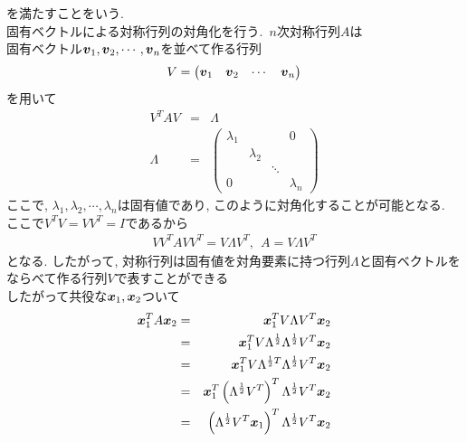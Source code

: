 \documentclass[dvipdfmx,a4j]{jsarticle}
\begin{document}
を満たすことをいう.\\
固有ベクトルによる対称行列の対角化を行う.\ $n$次対称行列$A$は\\
固有ベクトル$\mbox{\boldmath $v$}_{1},\mbox{\boldmath $v$}_{2},\cdots,\mbox{\boldmath $v$}_{n}$を並べて作る行列
\begin{eqnarray*}
    V=\begin{pmatrix}\mbox{\boldmath $v$}_{1}&\mbox{\boldmath $v$}_{2}&\cdots&\mbox{\boldmath $v$}_{n}\end{pmatrix}
\end{eqnarray*}
を用いて
\begin{eqnarray*}
    V^{T}AV &=& \Lambda\\
    \Lambda&=&\begin{pmatrix}\lambda_{1}&&&0\\ & \lambda_{2}&&\\ &&\ddots& \\ 0&&&\lambda_{n}\end{pmatrix}
\end{eqnarray*}
ここで, $\lambda_{1},\lambda_{2},\cdots,\lambda_{n}$は固有値であり, このように対角化することが可能となる.\\
ここで$V^{T}V=VV^{T}=I$であるから
\begin{eqnarray*}
    VV^{T}AVV^{T}=V\Lambda V^{T},\ \ A=V\Lambda V^{T}
\end{eqnarray*}
となる. したがって, 対称行列は固有値を対角要素に持つ行列$\Lambda$と固有ベクトルをならべて作る行列$V$で表すことができる\\
したがって共役な$\mbox{\boldmath $x$}_{1},\mbox{\boldmath $x$}_{2}$ついて
\begin{eqnarray*}
    \mbox{\boldmath $x$}_{1}^{T}A\mbox{\boldmath $x$}_{2}&=&\mbox{\boldmath $x$}_{1}^{T}V\Lambda V^{T}\mbox{\boldmath $x$}_{2}\\
                                                        &=&\mbox{\boldmath $x$}_{1}^{T}V\Lambda^{\frac{1}{2}}\Lambda^{\frac{1}{2}}V^{T}\mbox{\boldmath $x$}_{2}\\
                                                        &=&\mbox{\boldmath $x$}_{1}^{T}V\Lambda^{\frac{1}{2}T}\Lambda^{\frac{1}{2}}V^{T}\mbox{\boldmath $x$}_{2}\\
                                                        &=&\mbox{\boldmath $x$}_{1}^{T}\left(\Lambda^{\frac{1}{2}}V^{T}\right)^{T}\Lambda^{\frac{1}{2}}V^{T}\mbox{\boldmath $x$}_{2}\\
    &=&\left(\Lambda^{\frac{1}{2}}V^{T}\mbox{\boldmath $x$}_{1}\right)^{T}\Lambda^{\frac{1}{2}}V^{T}\mbox{\boldmath $x$}_{2}
\end{eqnarray*}
\end{document}
